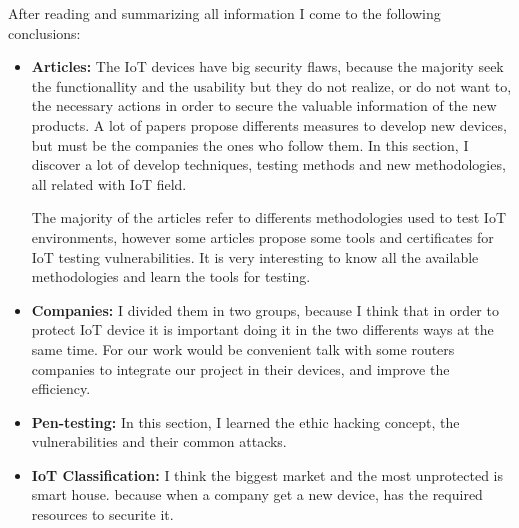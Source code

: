 
After reading and summarizing all information I come to the following conclusions:

\begin{itemize}
	\item \textbf{Articles:} 
	The IoT devices have big security flaws, because the majority seek the functionallity and the usability but they do not realize, or do not want to, the necessary actions in order to secure the valuable information of the new products. A lot of papers propose differents measures to develop new devices, but must be the companies the ones who follow them. In this section, I discover a lot of develop techniques, testing methods and new methodologies, all related with IoT field.
	
	The majority of the articles refer to differents methodologies used to test IoT environments, however some articles propose some tools and certificates for IoT testing vulnerabilities. It is very interesting to know all the available methodologies and learn the tools for testing.
	
	\item \textbf{Companies:} I divided them in two groups, because I think that in order to protect IoT device it is important doing it in the two differents ways at the same time. For our work would be convenient talk with some routers companies to integrate our project in their devices, and improve the efficiency.

	\item \textbf{Pen-testing:} In this section, I learned the ethic hacking concept, the vulnerabilities and their common attacks.
	
	\item \textbf{IoT Classification:} I think the biggest market and the most unprotected is smart house. because when a company get a new device, has the required resources to securite it.
\end{itemize}